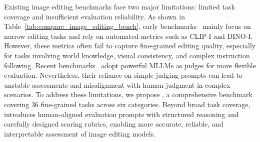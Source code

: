 \begin{table}[t]
 
\caption{\textbf{Comparison between \rmbench\ and existing image editing reward benchmarks.}
\texttt{AVR} denotes Algorithm Visual Reasoning, \texttt{DM} denotes Dynamic Manipulation, \texttt{WKR} denotes World Knowledge Reasoning, and \texttt{CP} denotes Complex Paint.}
\vspace{0.5em}
\label{tab:compare_image_editing_reward_bench}
\centering
{}

\end{table}

Existing image editing benchmarks face two major limitations: limited task coverage and insufficient evaluation reliability. As shown in Table~\ref{tab:compare_image_editing_bench}, early benchmarks~\cite{zhang2023magicbrush,sheynin2024emu,yu2025anyedit,pan2025ice} mainly focus on narrow editing tasks and rely on automated metrics such as CLIP-I and DINO-I. However, these metrics often fail to capture fine-grained editing quality, especially for tasks involving world knowledge, visual consistency, and complex instruction following.
Recent benchmarks~\cite{ye2025imgedit,liu2025step1x,zhao2025envisioning,zhang2026well} adopt powerful MLLMs as judges for more flexible evaluation. Nevertheless, their reliance on simple judging prompts can lead to unstable assessments and misalignment with human judgment in complex scenarios.
To address these limitations, we propose \textbf{{\bench}}, a comprehensive benchmark covering $36$ fine-grained tasks across six categories. Beyond broad task coverage, {\bench} introduces human-aligned evaluation prompts with structured reasoning and carefully designed scoring rubrics, enabling more accurate, reliable, and interpretable assessment of image editing models.


